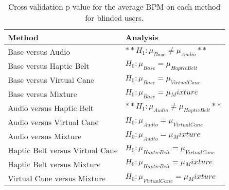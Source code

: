 
\begin{table}[!htb]
\centering
\caption{Cross validation p-value for the average BPM on each method for blinded users.}
\label{tab:lsd_average_bpm}
\begin{tabular}{ll}
\toprule
                         Method &                                      Analysis \\
\midrule
              Base versus Audio &             $**H_{1} : \mu_{Base} \ne \mu_{Audio}**$ \\
        Base versus Haptic Belt &         $H_{0} : \mu_{Base} = \mu_{Haptic Belt}$ \\
       Base versus Virtual Cane &        $H_{0} : \mu_{Base} = \mu_{Virtual Cane}$ \\
            Base versus Mixture &             $H_{0} : \mu_{Base} = \mu{_Mixture}$ \\
       Audio versus Haptic Belt &      $**H_{1} : \mu_{Audio} \ne \mu_{Haptic Belt}**$ \\
      Audio versus Virtual Cane &       $H_{0} : \mu_{Audio} = \mu_{Virtual Cane}$ \\
           Audio versus Mixture &            $H_{0} : \mu_{Audio} = \mu{_Mixture}$ \\
Haptic Belt versus Virtual Cane & $H_{0} : \mu_{Haptic Belt} = \mu_{Virtual Cane}$ \\
     Haptic Belt versus Mixture &      $H_{0} : \mu_{Haptic Belt} = \mu{_Mixture}$ \\
    Virtual Cane versus Mixture &     $H_{0} : \mu_{Virtual Cane} = \mu{_Mixture}$ \\
\bottomrule
\end{tabular}
\end{table}

